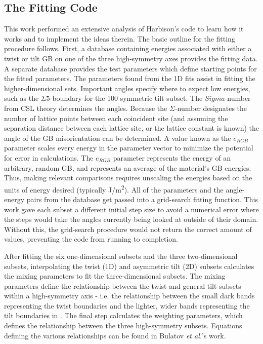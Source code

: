 \documentclass[12pt]{report}
\begin{document}
\subsection{The Fitting Code\label{code:fitting}}
This work performed an extensive analysis of Harbison's code to learn how it works and to implement the ideas therein.  The basic outline for the fitting procedure follows.  First, a database containing energies associated with either a twist or tilt GB on one of the three high-symmetry axes provides the fitting data.  A separate database provides the test parameters which define starting points for the fitted parameters.  The parameters found from the 1D fits assist in fitting the higher-dimensional sets.  Important angles specify where to expect low energies, such as the $\Sigma5$ boundary for the \textlangle{}100\textrangle{} symmetric tilt subset.  The $Sigma$-number from CSL theory determines the angles. Because the $\Sigma$-number designates the number of lattice points between each coincident site (and assuming the separation distance between each lattice site, or the lattice constant is known) the angle of the GB misorientation can be determined.  A value known as the $e_{RGB}$ parameter scales every energy in the parameter vector to minimize the potential for error in calculations. The $e_{RGB}$ parameter represents the energy of an arbitrary, random GB, and represents an average of the material's GB energies.  Thus, making relevant comparisons requires unscaling the energies based on the units of energy desired (typically J/m\textsuperscript{2}).  All of the parameters and the angle-energy pairs from the database get passed into a grid-search fitting function.  This work gave each subset a different initial step size to avoid a numerical error where the steps would take the angles currently being looked at outside of their domain. Without this, the grid-search procedure would not return the correct amount of values, preventing the code from running to completion.

After fitting the six one-dimensional subsets and the three two-dimensional subsets, interpolating the twist (1D) and asymmetric tilt (2D) subsets calculates the mixing parameters to fit the three-dimensional subsets.  The mixing parameters define the relationship between the twist and general tilt subsets within a high-symmetry axis - i.e. the relationship between the small dark bands representing the twist boundaries and the lighter, wider bands representing the tilt boundaries in .  The final step calculates the weighting parameters, which defines the relationship between the three high-symmetry subsets.  Equations defining the various relationships can be found in Bulatov \emph{et al.}'s work.\cite{bulatov2014}
\end{document}
